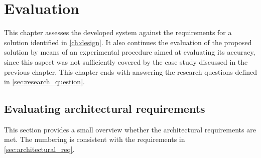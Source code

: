 \chapter{Evaluation}\label{ch:evaluation}
This chapter assesses the developed system against the requirements for a solution identified in \autoref{ch:design}. It also continues the evaluation of the proposed solution by means of an experimental procedure aimed at evaluating its accuracy, since this aspect was not sufficiently covered by the case study discussed in the previous chapter. This chapter ends with answering the research questions defined in \autoref{sec:research_question}.

\section{Evaluating architectural requirements} \label{sec:eval_arch_req}
This section provides a small overview whether the architectural requirements are met. The numbering is consistent with the requirements in \autoref{sec:architectural_req}.

